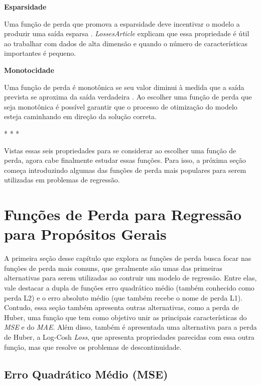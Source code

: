 \medskip
\textbf{Esparsidade}
\medskip

Uma função de perda que promova a esparsidade deve incentivar o modelo a produzir uma saída esparsa \parencite{LossesArticle}. \textit{LossesArticle} explicam que essa propriedade é útil ao trabalhar com dados de alta dimensão e quando o número de características importantes é pequeno.

\medskip
\textbf{Monotocidade}
\medskip

Uma função de perda é monotônica se seu valor diminui à medida que a saída prevista se aproxima da saída verdadeira \parencite{LossesArticle}. Ao escolher uma função de perda que seja monotônica é possível garantir que o processo de otimização do modelo esteja caminhando em direção da solução correta.

\medskip
\begin{center}
 * * *
\end{center}
\medskip

Vistas essas seis propriedades para se considerar ao escolher uma função de perda, agora cabe finalmente estudar essas funções. Para isso, a próxima seção começa introduzindo algumas das funções de perda mais populares para serem utilizadas em problemas de regressão.

\section{Funções de Perda para Regressão para Propósitos Gerais}

A primeira seção desse capítulo que explora as funções de perda busca focar nas funções de perda mais comuns, que geralmente são umas das primeiras alternativas para serem utilizadas ao contruir um modelo de regressão. Entre elas, vale destacar a dupla de funções erro quadrático médio (também conhecido como perda L2) e o erro absoluto médio (que também recebe o nome de perda L1). Contudo, essa seção também apresenta outras alternativas, como a perda de Huber, uma função que tem como objetivo unir as principais características do \textit{MSE} e do \textit{MAE}. Além disso, também é apresentada uma alternativa para a perda de Huber, a Log-Cosh \textit{Loss}, que apresenta propriedades parecidas com essa outra função, mas que resolve os problemas de descontinuidade.

\subsection{Erro Quadrático Médio (MSE)} 
\label{sec:mse-loss}

